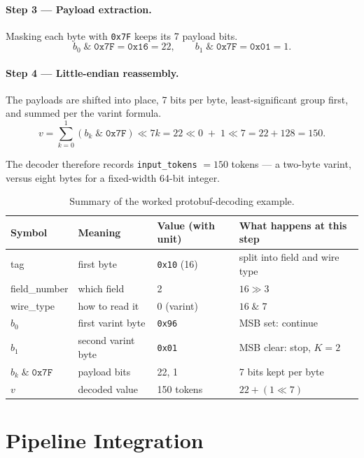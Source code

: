 \documentclass[11pt,a4paper]{article}
\begin{document}
\paragraph{Step 3 --- Payload extraction.}
Masking each byte with \texttt{0x7F} keeps its 7 payload bits.
\[
  b_0 \;\&\; \texttt{0x7F} = \texttt{0x16} = 22,
  \qquad
  b_1 \;\&\; \texttt{0x7F} = \texttt{0x01} = 1.
\]

\paragraph{Step 4 --- Little-endian reassembly.}
The payloads are shifted into place, 7 bits per byte, least-significant
group first, and summed per the varint formula.
\[
  v = \sum_{k=0}^{1} (b_k \;\&\; \texttt{0x7F}) \ll 7k
    = 22 \ll 0 \;+\; 1 \ll 7
    = 22 + 128
    = 150.
\]

The decoder therefore records \texttt{input\_tokens} $= 150$ tokens ---
a two-byte varint, versus eight bytes for a fixed-width 64-bit integer.

\begin{table}[h!]
\centering
\caption{Summary of the worked protobuf-decoding example.}
\label{tab:proto-worked}
\begin{tabular}{@{}llll@{}}
\toprule
Symbol & Meaning & Value (with unit) & What happens at this step \\
\midrule
tag & first byte & \texttt{0x10} (16) & split into field and wire type \\
field\_number & which field & 2 & $16 \gg 3$ \\
wire\_type & how to read it & 0 (varint) & $16 \;\&\; 7$ \\
$b_0$ & first varint byte & \texttt{0x96} & MSB set: continue \\
$b_1$ & second varint byte & \texttt{0x01} & MSB clear: stop, $K = 2$ \\
$b_k \;\&\; \texttt{0x7F}$ & payload bits & 22, 1 & 7 bits kept per byte \\
$v$ & decoded value & 150 tokens & $22 + (1 \ll 7)$ \\
\bottomrule
\end{tabular}
\end{table}

\section{Pipeline Integration}
\label{sec:pipeline}
\end{document}
